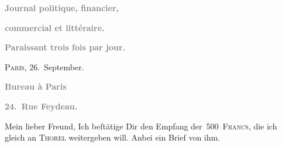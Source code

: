 \pstart
           \begin{otherlanguage}{french}\textcolor{gray}{\textbf{Journal politique,
                        financier,}}\end{otherlanguage}\pend
           
\pstart
           \begin{otherlanguage}{french}\textcolor{gray}{\textbf{commercial et littéraire.}}\end{otherlanguage}\pend
           
\pstart
           \begin{otherlanguage}{french}\textcolor{gray}{\textbf{\textbf{Paraissant trois fois par jour.}}}\end{otherlanguage}\hfill \textsc{Paris}, 26. September.\pend
           
\pstart
           \begin{otherlanguage}{french}\textcolor{gray}{\textbf{\textbf{Bureau à Paris}}}\end{otherlanguage}\pend
           
\pstart
           \begin{otherlanguage}{french}\textcolor{gray}{\textbf{\textbf{24. Rue Feydeau.}}}\end{otherlanguage}\pend
           
\pstart\center{}Mein lieber Freund,\pend\vspace{0.5em}
\pstart
            Ich beſtätige Dir den Empfang der 500 \textsc{Francs}, die ich
               gleich an \textsc{Thorel} weitergeben will. Anbei ein Brief von ihm.\pend
           
